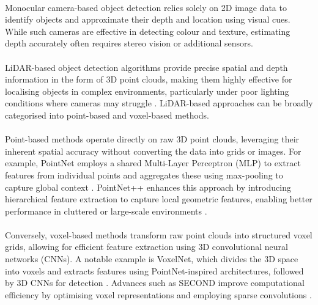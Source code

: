 \paragraph*{} 
Monocular camera-based object detection relies solely on 2D image data to identify objects and approximate their depth and location using visual cues. While such cameras are effective in detecting colour and texture, estimating depth accurately often requires stereo vision or additional sensors.

\paragraph*{} 
LiDAR-based object detection algorithms provide precise spatial and depth information in the form of 3D point clouds, making them highly effective for localising objects in complex environments, particularly under poor lighting conditions where cameras may struggle \cite{geiger2013vision}. LiDAR-based approaches can be broadly categorised into point-based and voxel-based methods.

\paragraph*{} 
Point-based methods operate directly on raw 3D point clouds, leveraging their inherent spatial accuracy without converting the data into grids or images. For example, PointNet employs a shared Multi-Layer Perceptron (MLP) to extract features from individual points and aggregates these using max-pooling to capture global context \cite{qi2017pointnet}. PointNet++ enhances this approach by introducing hierarchical feature extraction to capture local geometric features, enabling better performance in cluttered or large-scale environments \cite{qi2017pointnet++}.

\paragraph*{} 
Conversely, voxel-based methods transform raw point clouds into structured voxel grids, allowing for efficient feature extraction using 3D convolutional neural networks (CNNs). A notable example is VoxelNet, which divides the 3D space into voxels and extracts features using PointNet-inspired architectures, followed by 3D CNNs for detection \cite{zhou2018voxelnet}. Advances such as SECOND improve computational efficiency by optimising voxel representations and employing sparse convolutions \cite{yan2018second}.


